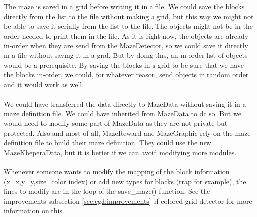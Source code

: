 
The maze is saved in a grid before writing it in a file. We could 
save the blocks directly from the list to the file without making a 
grid, but this way we might not be able to save it serially 
from the list to the file. The objects might not be in the order needed
to print them in the file.
As it is right now, the objects are already in-order when they are 
send from the MazeDetector, so we could save it directly in a file 
without saving it in a grid. But by doing this, an in-order list of 
objects would be a prerequisite. By saving the blocks in a grid to be 
sure that we have the blocks in-order, we could, for whatever 
reason, send objects in random order and it would work as well. 
\\
\\
We could have transferred the data directly to MazeData without saving 
it in a maze definition file. We could have inherited from MazeData 
to do so. But we would need to modify some part of MazeData as they 
are not private but protected. Also and most of all, 
MazeReward and MazeGraphic rely 
on the maze definition file to build their maze definition. They could 
use the new MazeKheperaData, but it is better if we can avoid 
modifying more modules.
\\
\\
Whenever someone wants to modify the mapping of the block information 
(x=x,y=y,size=color index) or add new types for blocks (trap for example), 
the lines to modify are in the loop of 
the save\_maze() function. See the improvements subsection 
\ref{sec:cgd:improvements} of colored 
grid detector for more information on this.

